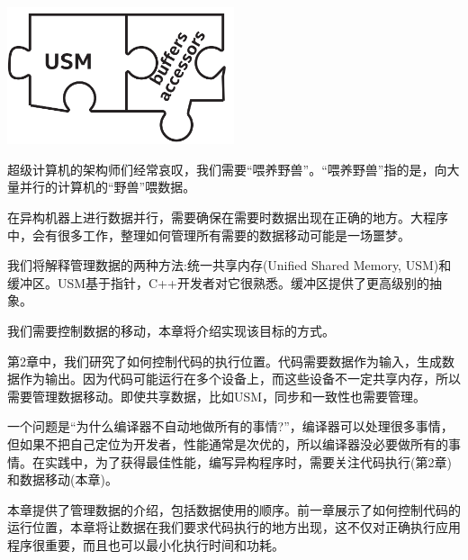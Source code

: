 \begin{center}
	\includegraphics[width=0.5\textwidth]{content/chapter-3/images/1}
\end{center}

超级计算机的架构师们经常哀叹，我们需要“喂养野兽”。“喂养野兽”指的是，向大量并行的计算机的“野兽”喂数据。\par

在异构机器上进行数据并行，需要确保在需要时数据出现在正确的地方。大程序中，会有很多工作，整理如何管理所有需要的数据移动可能是一场噩梦。\par

我们将解释管理数据的两种方法:统一共享内存(Unified Shared Memory, USM)和缓冲区。USM基于指针，C++开发者对它很熟悉。缓冲区提供了更高级别的抽象。\par

我们需要控制数据的移动，本章将介绍实现该目标的方式。\par

第2章中，我们研究了如何控制代码的执行位置。代码需要数据作为输入，生成数据作为输出。因为代码可能运行在多个设备上，而这些设备不一定共享内存，所以需要管理数据移动。即使共享数据，比如USM，同步和一致性也需要管理。\par

一个问题是“为什么编译器不自动地做所有的事情?”，编译器可以处理很多事情，但如果不把自己定位为开发者，性能通常是次优的，所以编译器没必要做所有的事情。在实践中，为了获得最佳性能，编写异构程序时，需要关注代码执行(第2章)和数据移动(本章)。\par

本章提供了管理数据的介绍，包括数据使用的顺序。前一章展示了如何控制代码的运行位置，本章将让数据在我们要求代码执行的地方出现，这不仅对正确执行应用程序很重要，而且也可以最小化执行时间和功耗。\par








